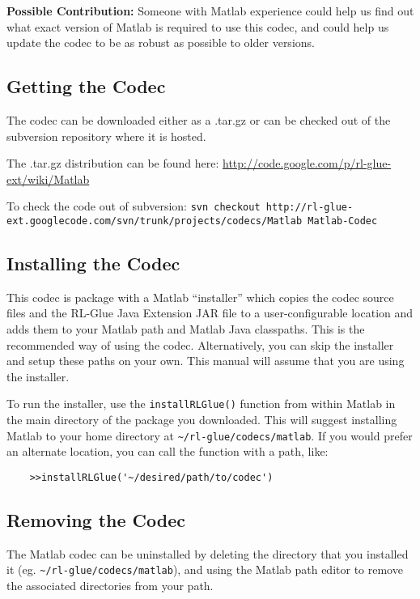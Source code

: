 \documentclass[11pt]{article}
\begin{document}
\textbf{Possible Contribution: }Someone with Matlab experience could help us find out what exact version of Matlab is required to use this codec, and could help us update the codec to be as robust as possible to older versions.


\subsection{Getting the Codec}
The codec can be downloaded either as a .tar.gz or can be checked out of the subversion repository where it is hosted.

The .tar.gz distribution can be found here:\newline
\url{http://code.google.com/p/rl-glue-ext/wiki/Matlab}


To check the code out of subversion:\newline
\small \texttt{svn checkout http://rl-glue-ext.googlecode.com/svn/trunk/projects/codecs/Matlab Matlab-Codec} \normalsize

\subsection{Installing the Codec}
This codec is package with a Matlab ``installer'' which copies the codec source files and the RL-Glue Java Extension JAR file to a user-configurable location and adds them to your Matlab path and Matlab Java classpaths.  This is the recommended way of using the codec.  Alternatively, you can skip the installer and setup these paths on your own.   This manual will assume that you are using the installer.

To run the installer, use the \texttt{installRLGlue()} function from within Matlab in the main directory of the package you downloaded.  This will suggest installing Matlab to your home directory at \texttt{\~{}/rl-glue/codecs/matlab}.  If you would prefer an alternate location, you can call the function with a path, like:
\begin{verbatim}
	>>installRLGlue('~/desired/path/to/codec')
\end{verbatim}

\subsection{Removing the Codec}
The Matlab codec can be uninstalled by deleting the directory that you installed it \newline(eg. \texttt{\~{}/rl-glue/codecs/matlab}), and using the Matlab path editor to remove the associated directories from your path.
\end{document}
